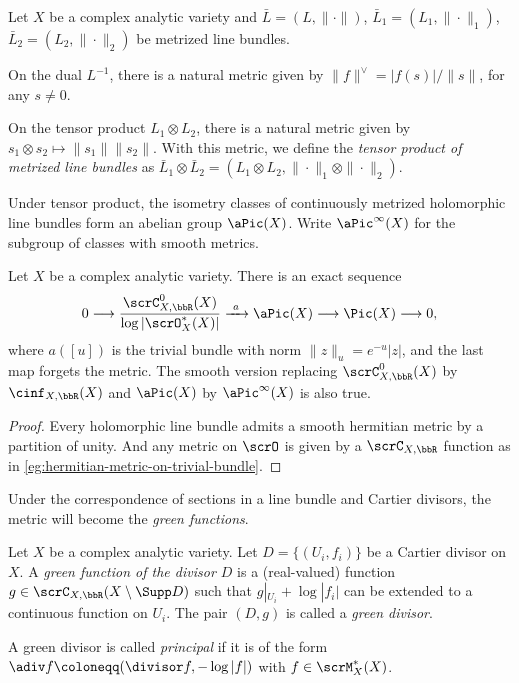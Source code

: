\begin{definition}[label=\labelNFM{def:tensor-product-of-metrics}, status=draft, tag=0000000]
	Let $X$ be a complex analytic variety and $\bar{L} = (L,\|\cdot\|)$, $\bar{L}_1 = (L_1,\|\cdot\|_1)$, $\bar{L}_2 = (L_2,\|\cdot\|_2)$ be metrized line bundles.

	On the dual $L^{-1}$, there is a natural metric given by $\|f\|^{\vee} = |f(s)|/\|s\|$, for any $s \neq 0$.

	On the tensor product $L_1 \otimes L_2$, there is a natural metric given by $s_1 \otimes s_2 \mapsto \|s_1\|\|s_2\|$.
	With this metric, we define the \emph{tensor product of metrized line bundles} as $\bar{L}_1 \otimes \bar{L}_2 = (L_1 \otimes L_2, \|\cdot\|_1 \otimes \|\cdot\|_2)$.

	Under tensor product, the isometry classes of continuously metrized holomorphic line bundles form an abelian group $\aPic(X)$.
	Write $\aPic^\infty(X)$ for the subgroup of classes with smooth metrics.
\end{definition}


\begin{proposition}[label=\labelNFM{prop:group-of-hermitian-line-bundles}, status=draft, tag=0000000]
	Let $X$ be a complex analytic variety.
	There is an exact sequence
	\[ 0 \longrightarrow \frac{\scrC_{X,\bbR}^0(X)}{\log|\scrO_X^*(X)|} \xrightarrow{\ a\ } \aPic(X) \longrightarrow \Pic(X) \longrightarrow 0, \]
	where $a([u])$ is the trivial bundle with norm $\|z\|_u = e^{-u}|z|$,
	and the last map forgets the metric.
	The smooth version replacing $\scrC_{X,\bbR}^0(X)$ by $\cinf_{X,\bbR}(X)$ and $\aPic(X)$ by $\aPic^\infty(X)$ is also true.
\end{proposition}
\begin{proof}
		Every holomorphic line bundle admits a smooth hermitian metric by a partition of unity.
    And any metric on $\scrO$ is given by a $\scrC_{X,\bbR}$ function as in \cref{eg:hermitian-metric-on-trivial-bundle}.
\end{proof}

Under the correspondence of sections in a line bundle and Cartier divisors, the metric will become the \emph{green functions}.

\begin{definition}\label{def:green-functions-for-a-divisor}
	Let $X$ be a complex analytic variety.
	Let $D = \{(U_i,f_i)\}$ be a Cartier divisor on $X$.
	A \emph{green function of the divisor $D$} is a (real-valued) function $g \in \scrC_{X,\bbR}(X \setminus \Supp D)$ such that $g|_{U_i} + \log |f_i|$ can be extended to a continuous function on $U_i$.
	The pair $(D,g)$ is called a \emph{green divisor}.

	A green divisor is called \emph{principal} if it is of the form $\adiv f \coloneqq (\divisor f, -\log|f|)$ with $f \in \scrM_X^*(X)$.

\end{definition}

